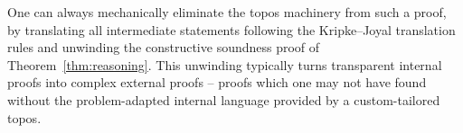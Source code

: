 \documentclass[oneside,reqno]{amsart}
\theoremstyle{definition}
\theoremstyle{plain}
\theoremstyle{remark}
\renewcommand{\_}{\mathpunct{.}\,}
\newcommand{\?}{\,{:}\,}
\begin{document}
One can always mechanically eliminate the topos machinery from such a proof, by
translating all intermediate statements following the Kripke--Joyal translation
rules and unwinding the constructive soundness proof of
Theorem~\ref{thm:reasoning}. This unwinding typically turns transparent
internal proofs into complex external proofs -- proofs which one may not have
found without the problem-adapted internal language provided by a
custom-tailored topos.



\printbibliography
\end{document}
